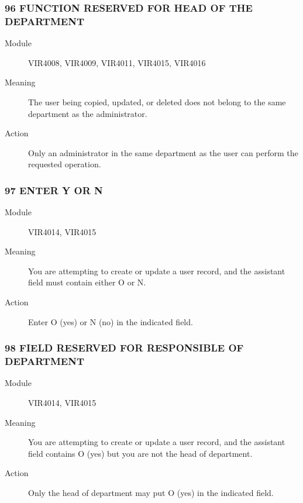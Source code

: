 \documentclass[letterpaper,10pt,english]{sphinxmanual}
\begin{document}
\subsubsection{96 FUNCTION RESERVED FOR HEAD OF THE DEPARTMENT}
\label{\detokenize{messages:function-reserved-for-head-of-the-department}}\begin{description}
\item[{Module}] \leavevmode
VIR4008, VIR4009, VIR4011, VIR4015, VIR4016

\item[{Meaning}] \leavevmode
The user being copied, updated, or deleted does not belong to the same department as the administrator.

\item[{Action}] \leavevmode
Only an administrator in the same department as the user can perform the requested operation.

\end{description}


\subsubsection{97 ENTER Y OR N}
\label{\detokenize{messages:enter-y-or-n}}\begin{description}
\item[{Module}] \leavevmode
VIR4014, VIR4015

\item[{Meaning}] \leavevmode
You are attempting to create or update a user record, and the assistant field must contain either O or N.

\item[{Action}] \leavevmode
Enter O (yes) or N (no) in the indicated field.

\end{description}


\subsubsection{98 FIELD RESERVED FOR RESPONSIBLE OF DEPARTMENT}
\label{\detokenize{messages:field-reserved-for-responsible-of-department}}\begin{description}
\item[{Module}] \leavevmode
VIR4014, VIR4015

\item[{Meaning}] \leavevmode
You are attempting to create or update a user record, and the assistant field contains O (yes) but you are not the head of department.

\item[{Action}] \leavevmode
Only the head of department may put O (yes) in the indicated field.

\end{description}
\end{document}
